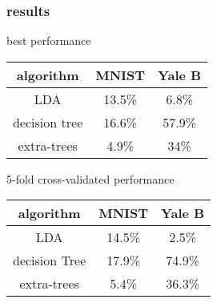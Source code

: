 \begin{frame}
  \frametitle{results}

best performance
  \begin{table}[H]
  \centering
  \begin{tabular}{c | c | c} 
    algorithm & MNIST & Yale B \\
    \hline
    LDA & 13.5\%  & 6.8\% \\ 
    \hline
    decision tree & 16.6\% & 57.9\% \\ 
    \hline
    extra-trees & 4.9\% & 34\% \\
  \end{tabular}
\end{table}
5-fold cross-validated performance
%
\begin{table}[H]
  \centering
  \begin{tabular}{c | c | c} 
    algorithm & MNIST & Yale B \\
    \hline
    LDA & 14.5\%  & 2.5\% \\ 
    \hline
    decision Tree & 17.9\% & 74.9\% \\ 
    \hline
    extra-trees & 5.4\% & 36.3\% \\
  \end{tabular}
\end{table}

\end{frame}